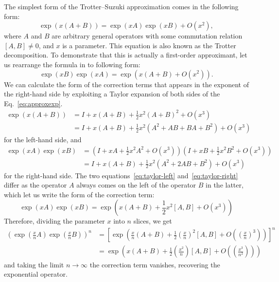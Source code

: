 The simplest form of the Trotter--Suzuki approximation comes in the following form:
\begin{equation} \label{eq:approxexp}
\exp\left({x(A+B)}\right) = \exp\left({xA}\right)\exp\left({xB}\right) + O(x^2), 
\end{equation}
where $A$ and $B$ are arbitrary general operators with some commutation relation $[A,B] \neq 0$, and $x$ is a parameter. This equation is also known as the Trotter decomposition. To demonstrate that this is actually a first-order approximant, let us rearrange the formula in to following form:
\begin{equation}
\exp\left({xB}\right)\exp\left({xA}\right) = \exp\left({x(A+B) + O(x^2)}\right).
\end{equation}
We can calculate the form of the correction terms that appears in the exponent of the right-hand side by exploiting a Taylor expansion of both sides of the Eq.~\eqref{eq:approxexp}.
\begin{subequations} \label{eq:taylor-left}
\begin{align}
\exp\left({x(A+B)}\right) &= I + x(A+B) + \frac{1}{2} x^2 (A+B)^2 + O(x^3) \\
& = I + x(A+B) + \frac{1}{2} x^2 (A^2 + AB + BA + B^2) + O(x^3) 
\end{align}
\end{subequations}
for the left-hand side, and
\begin{subequations}  \label{eq:taylor-right}
\begin{align}
\exp\left({xA}\right)\exp\left({xB}\right) &= (I + xA + \frac{1}{2} x^2 A^2 + O(x^3)) (I + xB + \frac{1}{2} x^2 B^2 + O(x^3))\\
& = I + x(A+B) + \frac{1}{2} x^2 (A^2 + 2AB + B^2) + O(x^3)  
\end{align}
\end{subequations}
for the right-hand side. The two equations~\eqref{eq:taylor-left} and~\eqref{eq:taylor-right} differ as the operator $A$ always comes on the left of the operator $B$ in the latter, which let us write the form of the correction term:
\begin{equation}
\exp\left({xA}\right) \exp\left({xB}\right) = \exp\left({x(A+B) + \frac{1}{2} x^2 [A,B] + O(x^3)}\right)
\end{equation}
Therefore, dividing the parameter $x$ into $n$ slices, we get
\begin{align}
\left(\exp\left({\frac{x}{n}A}\right) \exp\left({\frac{x}{n}B}\right) \right)^n &= \left[ \exp\left({\frac{x}{n}(A + B) + \frac{1}{2}\left(\frac{x}{n}\right)^2 [A,B] + O\left(\left(\frac{x}{n}\right)^3\right)}\right) \right]^n \nonumber \\ 
&= \exp\left({x(A+B) + \frac{1}{2}\left(\frac{x^2}{n}\right) [A,B] + O\left(\left(\frac{x^3}{n^2}\right)\right)}\right) \nonumber
\end{align}
and taking the limit $n \rightarrow \infty$ the correction term vanishes, recovering the exponential operator.

